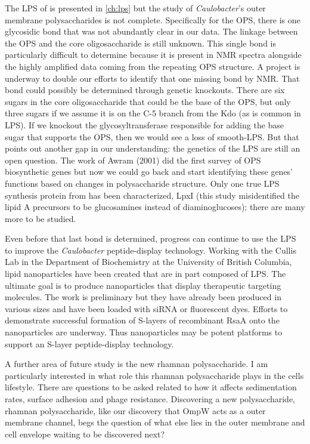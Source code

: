 The \ac{LPS} of \caulobacter{} is presented in \cref{ch:lps} but the study of \textit{Caulobacter}'s outer membrane polysaccharides is not complete. Specifically for the \ac{OPS}, there is one glycosidic bond that was not abundantly clear in our data. The linkage between the \ac{OPS} and the core oligosaccharide is still unknown. This  single bond is particularly difficult to determine because it is present in \ac{NMR} spectra alongside the highly amplified data coming from the repeating \ac{OPS} structure. A project is underway to double our efforts to identify that one missing bond by \ac{NMR}. That bond could possibly  be determined through genetic knockouts. There are six sugars in the core oligosaccharide that could be the base of the \ac{OPS}, but only three sugars if we assume it is on the C-5 branch from the Kdo (as is common in LPS). If we knockout the glycosyltransferase responsible for adding the base sugar that supports the \ac{OPS}, then we would see a loss of smooth-\ac{LPS}. But that points out another gap in our understanding: the genetics of the \caulobacter{} \ac{LPS} are still an open question. The work of Awram \etal{} (2001) did the first survey of \ac{OPS} biosynthetic genes but now we could go back and start identifying these genes' functions based on changes in polysaccharide structure. Only one true \ac{LPS} synthesis protein from \caulobacter{} has been characterized, LpxI (this study misidentified the \caulobacter lipid A precursors to be glucosamines instead of diaminoglucoses); there are many more to be studied. 

Even before that last bond is determined, progress can continue to use the \ac{LPS} to improve the \textit{Caulobacter} peptide-display technology. Working with the Cullis Lab in the Department of Biochemistry at the University of British Columbia, lipid nanoparticles have been created that are in part  composed of \caulobacter \ac{LPS}. The ultimate goal is to produce nanoparticles that display therapeutic targeting molecules. The work is preliminary but they have already been produced in various sizes and have been loaded with siRNA or fluorescent dyes. Efforts to demonstrate successful formation of \acp{S-layer} of recombinant RsaA onto the nanoparticles are underway. Thus nanoparticles  may be potent platforms to support an \ac{S-layer} peptide-display technology.

A further area of future study is the new rhamnan polysaccharide. I am particularly interested in what role this rhamnan polysaccharide plays in the cells lifestyle. There are questions to be asked related to how it affects sedimentation rates, surface adhesion and phage resistance. Discovering a new polysaccharide, rhamnan polysaccharide, like our discovery that OmpW acts as a outer membrane channel, begs the question of what else lies in the outer membrane and cell envelope waiting to be discovered next?
